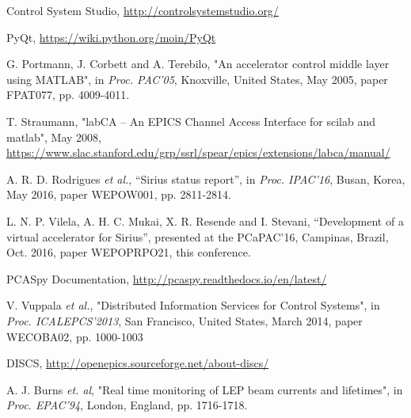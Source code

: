 \documentclass[a4paper,
              ]{jacow}
\begin{document}
\begin{thebibliography}{99}

		Control System Studio, \url{http://controlsystemstudio.org/}

		PyQt, \url{https://wiki.python.org/moin/PyQt}

		 G. Portmann, J. Corbett and A. Terebilo,
		 "An accelerator control middle layer using MATLAB",
		 in \emph{Proc. PAC'05},
		 Knoxville, United States, May 2005,
		 paper FPAT077, pp. 4009-4011.

		T. Straumann,
		"labCA -- An EPICS Channel Access Interface for scilab and matlab",
		May 2008,
		\url{https://www.slac.stanford.edu/grp/ssrl/spear/epics/extensions/labca/manual/}

		A. R. D. Rodrigues \emph{et al.},
		“Sirius status report”,
		in \emph{Proc. IPAC'16},
		Busan, Korea, May 2016,
		paper WEPOW001, pp. 2811-2814.

		L. N. P. Vilela, A. H. C. Mukai, X. R. Resende and I. Stevani,
		“Development of a virtual accelerator for Sirius”,
		presented at the PCaPAC'16,
		Campinas, Brazil, Oct. 2016,
		paper WEPOPRPO21, this conference.

		PCASpy Documentation, \url{http://pcaspy.readthedocs.io/en/latest/}

		V. Vuppala \emph{et al.},
		"Distributed Information Services for Control Systems",
		in \emph{Proc. ICALEPCS'2013},
		San Francisco, United States, March 2014,
		paper WECOBA02, pp. 1000-1003

		DISCS, \url{http://openepics.sourceforge.net/about-discs/}

	 	A. J. Burns \emph{et. al},
	 	"Real time monitoring of LEP beam currents and lifetimes",
	 	in \emph{Proc. EPAC'94},
	 	London, England, pp. 1716-1718.

\end{thebibliography}
\end{document}
